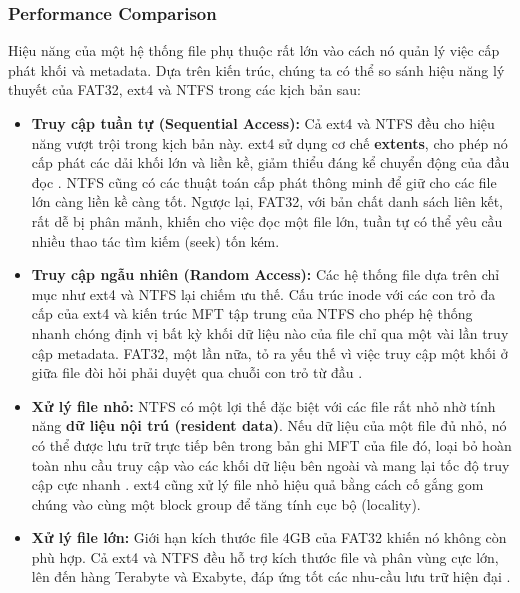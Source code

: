 \documentclass[12pt]{article}
\begin{document}
\subsubsection{Performance Comparison}
Hiệu năng của một hệ thống file phụ thuộc rất lớn vào cách nó quản lý việc cấp phát khối và metadata. Dựa trên kiến trúc, chúng ta có thể so sánh hiệu năng lý thuyết của FAT32, ext4 và NTFS trong các kịch bản sau:
\begin{itemize}
    \item \textbf{Truy cập tuần tự (Sequential Access):} Cả ext4 và NTFS đều cho hiệu năng vượt trội trong kịch bản này. ext4 sử dụng cơ chế \textbf{extents}, cho phép nó cấp phát các dải khối lớn và liền kề, giảm thiểu đáng kể chuyển động của đầu đọc \parencite{Dhjaku2019}. NTFS cũng có các thuật toán cấp phát thông minh để giữ cho các file lớn càng liền kề càng tốt. Ngược lại, FAT32, với bản chất danh sách liên kết, rất dễ bị phân mảnh, khiến cho việc đọc một file lớn, tuần tự có thể yêu cầu nhiều thao tác tìm kiếm (seek) tốn kém.

    \item \textbf{Truy cập ngẫu nhiên (Random Access):} Các hệ thống file dựa trên chỉ mục như ext4 và NTFS lại chiếm ưu thế. Cấu trúc inode với các con trỏ đa cấp của ext4 và kiến trúc MFT tập trung của NTFS cho phép hệ thống nhanh chóng định vị bất kỳ khối dữ liệu nào của file chỉ qua một vài lần truy cập metadata. FAT32, một lần nữa, tỏ ra yếu thế vì việc truy cập một khối ở giữa file đòi hỏi phải duyệt qua chuỗi con trỏ từ đầu \parencite{Silberschatz2018}.

    \item \textbf{Xử lý file nhỏ:} NTFS có một lợi thế đặc biệt với các file rất nhỏ nhờ tính năng \textbf{dữ liệu nội trú (resident data)}. Nếu dữ liệu của một file đủ nhỏ, nó có thể được lưu trữ trực tiếp bên trong bản ghi MFT của file đó, loại bỏ hoàn toàn nhu cầu truy cập vào các khối dữ liệu bên ngoài và mang lại tốc độ truy cập cực nhanh \parencite{Tanenbaum2014}. ext4 cũng xử lý file nhỏ hiệu quả bằng cách cố gắng gom chúng vào cùng một block group để tăng tính cục bộ (locality).

    \item \textbf{Xử lý file lớn:} Giới hạn kích thước file 4GB của FAT32 khiến nó không còn phù hợp. Cả ext4 và NTFS đều hỗ trợ kích thước file và phân vùng cực lớn, lên đến hàng Terabyte và Exabyte, đáp ứng tốt các nhu-cầu lưu trữ hiện đại \parencite{Dhjaku2019}.
\end{itemize}
\end{document}
